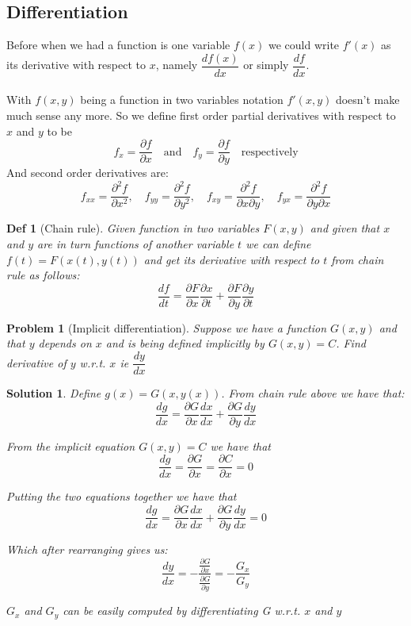 \documentclass[11pt,a4paper, margin]{article}
\theoremstyle{break}
\newtheorem*{problem}{Problem}
\theoremstyle{break}
\newtheorem*{solution}{Solution}
\newtheorem*{definition}{Def}
\begin{document}
\subsection{Differentiation}
Before when we had a function is one variable $f(x)$ we could write $f'(x)$ as its derivative with respect to $x$, namely $\dfrac{df(x)}{dx}$ or simply $\dfrac{df}{dx}$.\\ \\
With $f(x,y)$ being a function in two variables notation $f'(x,y)$ doesn't make much sense any more. So we define first order partial derivatives with respect to $x$ and $y$ to be \[f_x = \dfrac{\partial f}{\partial x} \quad \textrm{and} \quad f_y = \dfrac{\partial f}{\partial y} \quad \textrm{respectively}\] 
And second order derivatives are:
\[ f_{xx} = \dfrac{\partial^2f}{\partial x^2}, \quad f_{yy} = \dfrac{\partial^2f}{\partial y^2}, \quad f_{xy} = \dfrac{\partial^2f}{\partial x \partial y}, \quad f_{yx} = \dfrac{\partial^2f}{\partial y \partial x} \]

\begin{definition} [Chain rule]
Given function in two variables $F(x,y)$ and given that $x$ and $y$ are in turn functions of another variable $t$ we can define $f(t) = F(x(t), y(t))$ and get its derivative with respect to $t$ from chain rule as follows:
\[\dfrac{df}{dt} = \dfrac{\partial F}{\partial x}\dfrac{\partial x}{\partial t} + \dfrac{\partial F}{\partial y}\dfrac{\partial y}{\partial t}\] 
\end{definition}

\begin{problem}[Implicit differentiation]
Suppose we have a function $G(x,y)$ and that $y$ depends on $x$ and is being defined implicitly by $G(x,y) = C$. Find derivative of $y$ w.r.t. $x$ ie $\dfrac{dy}{dx}$
\end{problem}

\begin{solution}
Define $g(x) = G(x, y(x))$. From chain rule above we have that: \[\dfrac{dg}{dx} = \dfrac{\partial G}{\partial x} \dfrac{dx}{dx} + \dfrac{\partial G}{\partial y}\dfrac{dy}{dx}\]

From the implicit equation $G(x,y) = C$ we have that \[\dfrac{dg}{dx} = \dfrac{\partial G}{\partial x} = \dfrac{\partial C}{\partial x} = 0\]

Putting the two equations together we have that \[\dfrac{dg}{dx} = \dfrac{\partial G}{\partial x} \dfrac{dx}{dx} + \dfrac{\partial G}{\partial y}\dfrac{dy}{dx} = 0\]

Which after rearranging gives us: \[\dfrac{dy}{dx} = - \dfrac{\frac{\partial G}{\partial x}}{\frac{\partial G}{\partial y}} = - \dfrac{G_x}{G_y}\]

$G_x$ and $G_y$ can be easily computed by differentiating G w.r.t. $x$ and $y$
\end{solution}
\end{document}
